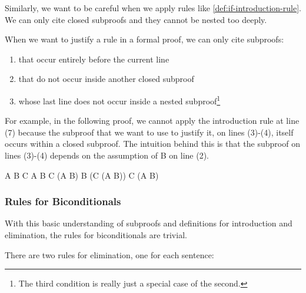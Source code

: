 Similarly, we want to be careful when we apply rules like
\ref{def:if-introduction-rule}. We can only cite closed subproofs and they
cannot be nested too deeply.

\begin{definition}
  \label{def:permissible-subproof-citations}
  When we want to justify a rule in a formal proof, we can only cite subproofs:
  \begin{enumerate}
  \item that occur entirely before the current line
  \item that do not occur inside another closed subproof
  \item whose last line does not occur inside a nested subproof\footnote{The
  third condition is really just a special case of the second.}
  \end{enumerate}  
\end{definition}

For example, in the following proof, we cannot apply the introduction rule
at line (7) because the subproof that we want to use to justify it, on lines
(3)-(4), itself occurs within a closed subproof. The intuition behind this is
that the subproof on lines (3)-(4) depends on the assumption of B on line (2).

\begin{fitchproof}
   {A}                           
  \open
   {B}                           
  \open
   {C}                           
   {A \eand B}                   
  \close
   {C \eif (A \eand B)}          
  \close
   {B \eif (C \eif (A \eand B))} 
   {C \eif (A \eand B)}          
\end{fitchproof}

\subsubsection{Rules for Biconditionals}

With this basic understanding of subproofs and definitions for \eif
introduction and \eif elimination, the rules for biconditionals are trivial. 

\begin{fitchrule}
  \label{def:iff-elimination-rule}
  \leavevmode
  There are two rules for \eiff elimination, one for each sentence: \\
\end{fitchrule}

